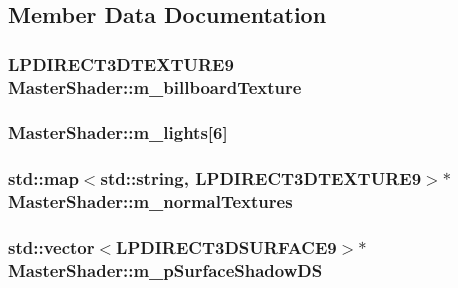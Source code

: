 \subsection{Member Data Documentation}
\hypertarget{class_master_shader_aa8db1d7a494db1b398700d8185f414f5}{
\subsubsection[{m\_\-billboardTexture}]{\setlength{\rightskip}{0pt plus 5cm}LPDIRECT3DTEXTURE9 {\bf MasterShader::m\_\-billboardTexture}}}
\label{class_master_shader_aa8db1d7a494db1b398700d8185f414f5}
\hypertarget{class_master_shader_abbcc71cc579b0d701276d373932bda52}{
\subsubsection[{m\_\-lights}]{ {\bf MasterShader::m\_\-lights}\mbox{[}6\mbox{]}}}
\label{class_master_shader_abbcc71cc579b0d701276d373932bda52}
\hypertarget{class_master_shader_aad808d20c01b79a070560263d64541f5}{
\subsubsection[{m\_\-normalTextures}]{\setlength{\rightskip}{0pt plus 5cm}std::map$<$std::string, LPDIRECT3DTEXTURE9$>$$\ast$ {\bf MasterShader::m\_\-normalTextures}}}
\label{class_master_shader_aad808d20c01b79a070560263d64541f5}
\hypertarget{class_master_shader_a051e371aa066bcdf405b08f77acdcccf}{
\subsubsection[{m\_\-pSurfaceShadowDS}]{\setlength{\rightskip}{0pt plus 5cm}std::vector$<$LPDIRECT3DSURFACE9$>$$\ast$ {\bf MasterShader::m\_\-pSurfaceShadowDS}}}

